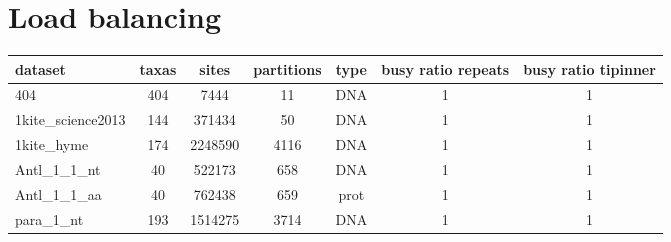 \documentclass[a4paper]{article}
\begin{document}
\section{Load balancing}


\begin{tabular}{|l|c|c|c|c|c|c|}
\hline dataset                    & taxas & sites    & partitions & type  & busy ratio repeats & busy ratio tipinner\\
\hline 404                        & 404   &  7444    & 11         & DNA  & 1  & 1  \\
\hline 1kite\_science2013         & 144   &  371434  & 50         & DNA  & 1  & 1  \\
\hline 1kite\_hyme                & 174   &  2248590 & 4116       & DNA  & 1 & 1  \\
\hline Antl\_1\_1\_nt             & 40    &  522173  & 658        & DNA  & 1 & 1   \\
\hline Antl\_1\_1\_aa             & 40    &  762438  & 659        & prot & 1 & 1  \\
\hline para\_1\_nt                & 193   &  1514275 & 3714       & DNA  & 1  & 1  \\
\hline 
\end{tabular}\newline
\newline


\end{document}
